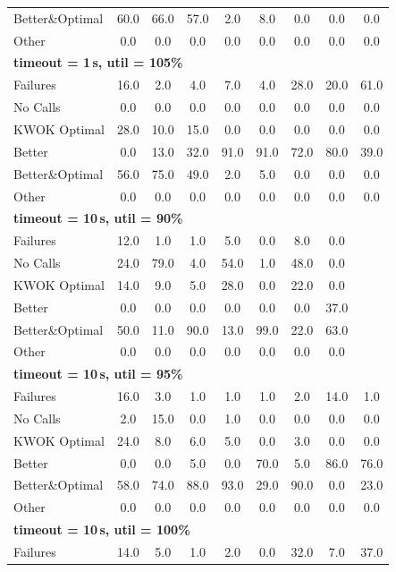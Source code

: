 \begin{tabular}{l cccccccc}
Better\&Optimal & 60.0 & 66.0 & 57.0 & 2.0 & 8.0 & 0.0 & 0.0 & 0.0 \\
Other & 0.0 & 0.0 & 0.0 & 0.0 & 0.0 & 0.0 & 0.0 & 0.0 \\
\midrule
\multicolumn{9}{l}{\textbf{timeout = 1\,s, util = 105\%}} \\
\midrule
Failures & 16.0 & 2.0 & 4.0 & 7.0 & 4.0 & 28.0 & 20.0 & 61.0 \\
No Calls & 0.0 & 0.0 & 0.0 & 0.0 & 0.0 & 0.0 & 0.0 & 0.0 \\
KWOK Optimal & 28.0 & 10.0 & 15.0 & 0.0 & 0.0 & 0.0 & 0.0 & 0.0 \\
Better & 0.0 & 13.0 & 32.0 & 91.0 & 91.0 & 72.0 & 80.0 & 39.0 \\
Better\&Optimal & 56.0 & 75.0 & 49.0 & 2.0 & 5.0 & 0.0 & 0.0 & 0.0 \\
Other & 0.0 & 0.0 & 0.0 & 0.0 & 0.0 & 0.0 & 0.0 & 0.0 \\
\midrule
\multicolumn{9}{l}{\textbf{timeout = 10\,s, util = 90\%}} \\
\midrule
Failures & 12.0 & 1.0 & 1.0 & 5.0 & 0.0 & 8.0 & 0.0 & \text{--} \\
No Calls & 24.0 & 79.0 & 4.0 & 54.0 & 1.0 & 48.0 & 0.0 & \text{--} \\
KWOK Optimal & 14.0 & 9.0 & 5.0 & 28.0 & 0.0 & 22.0 & 0.0 & \text{--} \\
Better & 0.0 & 0.0 & 0.0 & 0.0 & 0.0 & 0.0 & 37.0 & \text{--} \\
Better\&Optimal & 50.0 & 11.0 & 90.0 & 13.0 & 99.0 & 22.0 & 63.0 & \text{--} \\
Other & 0.0 & 0.0 & 0.0 & 0.0 & 0.0 & 0.0 & 0.0 & \text{--} \\
\midrule
\multicolumn{9}{l}{\textbf{timeout = 10\,s, util = 95\%}} \\
\midrule
Failures & 16.0 & 3.0 & 1.0 & 1.0 & 1.0 & 2.0 & 14.0 & 1.0 \\
No Calls & 2.0 & 15.0 & 0.0 & 1.0 & 0.0 & 0.0 & 0.0 & 0.0 \\
KWOK Optimal & 24.0 & 8.0 & 6.0 & 5.0 & 0.0 & 3.0 & 0.0 & 0.0 \\
Better & 0.0 & 0.0 & 5.0 & 0.0 & 70.0 & 5.0 & 86.0 & 76.0 \\
Better\&Optimal & 58.0 & 74.0 & 88.0 & 93.0 & 29.0 & 90.0 & 0.0 & 23.0 \\
Other & 0.0 & 0.0 & 0.0 & 0.0 & 0.0 & 0.0 & 0.0 & 0.0 \\
\midrule
\multicolumn{9}{l}{\textbf{timeout = 10\,s, util = 100\%}} \\
\midrule
Failures & 14.0 & 5.0 & 1.0 & 2.0 & 0.0 & 32.0 & 7.0 & 37.0 \\

\end{tabular}
